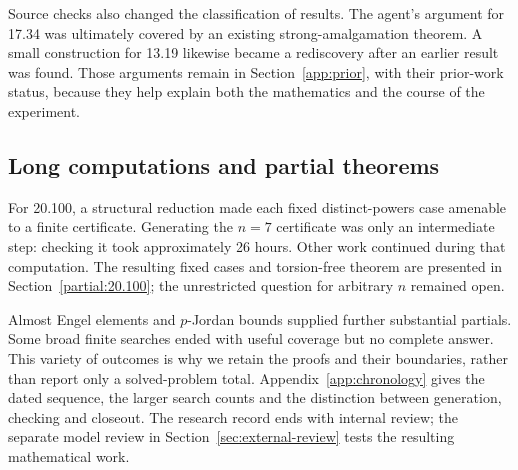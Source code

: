 Source checks also changed the classification of results. The agent's
argument for 17.34 was ultimately covered by an existing
strong-amalgamation theorem. A small construction for 13.19 likewise
became a rediscovery after an earlier result was found. Those arguments
remain in Section~\ref{app:prior}, with their prior-work status, because
they help explain both the mathematics and the course of the experiment.

\subsection{Long computations and partial theorems}

For 20.100, a structural reduction made each fixed distinct-powers case
amenable to a finite certificate. Generating the \(n=7\) certificate
was only an intermediate step: checking it took approximately 26 hours.
Other work continued during that computation. The resulting fixed cases
and torsion-free theorem are presented in Section~\ref{partial:20.100};
the unrestricted question for arbitrary \(n\) remained open.

Almost Engel elements and \(p\)-Jordan bounds supplied further substantial
partials. Some broad finite searches ended with useful coverage but no
complete answer. This variety of outcomes is why we retain the proofs
and their boundaries, rather than report only a solved-problem total.
Appendix~\ref{app:chronology} gives the dated sequence, the larger search
counts and the distinction between generation, checking and closeout.
The research record ends with internal review; the separate model review
in Section~\ref{sec:external-review} tests the resulting mathematical work.
